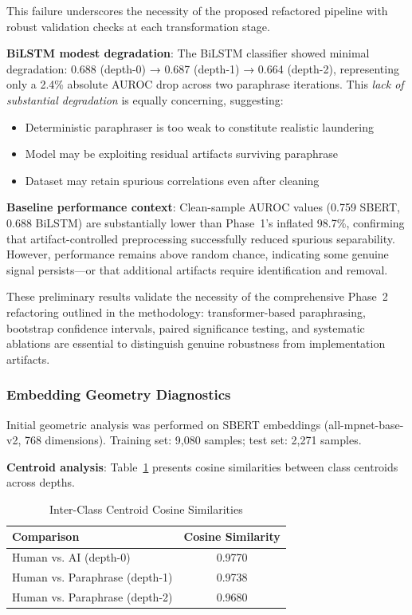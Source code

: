 \documentclass[conference]{IEEEtran}
\begin{document}
This failure underscores the necessity of the proposed refactored pipeline with robust validation checks at each transformation stage.

\textbf{BiLSTM modest degradation}: The BiLSTM classifier showed minimal degradation: 0.688 (depth-0) → 0.687 (depth-1) → 0.664 (depth-2), representing only a 2.4\% absolute AUROC drop across two paraphrase iterations. This \emph{lack of substantial degradation} is equally concerning, suggesting:

\begin{itemize}
    \item Deterministic paraphraser is too weak to constitute realistic laundering
    \item Model may be exploiting residual artifacts surviving paraphrase
    \item Dataset may retain spurious correlations even after cleaning
\end{itemize}

\textbf{Baseline performance context}: Clean-sample AUROC values (0.759 SBERT, 0.688 BiLSTM) are substantially lower than Phase~1's inflated 98.7\%, confirming that artifact-controlled preprocessing successfully reduced spurious separability. However, performance remains above random chance, indicating some genuine signal persists—or that additional artifacts require identification and removal.

These preliminary results validate the necessity of the comprehensive Phase~2 refactoring outlined in the methodology: transformer-based paraphrasing, bootstrap confidence intervals, paired significance testing, and systematic ablations are essential to distinguish genuine robustness from implementation artifacts.

\subsubsection{Embedding Geometry Diagnostics}

Initial geometric analysis was performed on SBERT embeddings (all-mpnet-base-v2, 768 dimensions). Training set: 9,080 samples; test set: 2,271 samples.

\textbf{Centroid analysis}: Table~\ref{tab:centroid_cosine} presents cosine similarities between class centroids across depths.

\begin{table}[h]
\centering
\caption{Inter-Class Centroid Cosine Similarities}
\label{tab:centroid_cosine}
\begin{tabular}{lc}
\toprule
\textbf{Comparison} & \textbf{Cosine Similarity} \\
\midrule
Human vs. AI (depth-0) & 0.9770 \\
Human vs. Paraphrase (depth-1) & 0.9738 \\
Human vs. Paraphrase (depth-2) & 0.9680 \\
\bottomrule
\end{tabular}
\end{table}
\end{document}
